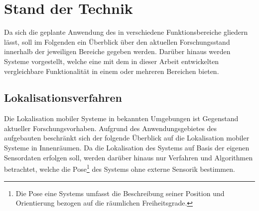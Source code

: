 \chapter{Stand der Technik}
\label{chap.tech}

Da sich die geplante Anwendung des  in verschiedene Funktionsbereiche gliedern lässt, soll im Folgenden ein Überblick über den aktuellen Forschungsstand innerhalb der jeweiligen Bereiche gegeben werden. Darüber hinaus werden Systeme vorgestellt, welche eine mit dem in dieser Arbeit entwickelten \kps{} vergleichbare Funktionalität in einem oder mehreren Bereichen bieten.

\section{Lokalisationsverfahren}
\label{chap:mcl}
Die Lokalisation mobiler Systeme in bekannten Umgebungen ist Gegenstand aktueller Forschungsvorhaben. Aufgrund des Anwendungsgebietes des aufgebauten  beschränkt sich der folgende Überblick auf die Lokalisation mobiler Systeme in Innenräumen. Da die Lokalisation des Systems auf Basis der eigenen Sensordaten erfolgen soll, werden darüber hinaus nur Verfahren und Algorithmen betrachtet, welche die Pose\footnote{Die Pose eine Systems umfasst die Beschreibung seiner Position und Orientierung bezogen auf die räumlichen Freiheitsgrade.} des Systems ohne externe Sensorik bestimmen.\\

